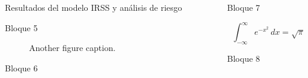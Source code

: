 \documentclass[final]{beamer}
\newlength{\sepwidth}
\newlength{\colwidth}
\newcommand{\separatorcolumn}{\begin{column}{\sepwidth}\end{column}}
\begin{document}
\begin{frame}[t]
\begin{columns}[t]
\begin{column}{\colwidth}
\begin{block}{Resultados del modelo IRSS y análisis de riesgo}
  \end{block}
  \begin{block}{Bloque 5}

    \begin{figure}
      \centering
      \caption{Another figure caption.}
    \end{figure}

  \end{block}
  \begin{block}{Bloque 6}



  \end{block}

\end{column}

\separatorcolumn

\begin{column}{\colwidth}
  \begin{exampleblock}{Bloque 7}

    $$
    \int_{-\infty}^{\infty} e^{-x^2}\,dx = \sqrt{\pi}
    $$


  \end{exampleblock}
  \begin{block}{Bloque 8}



\end{block}
\end{column}
\end{columns}
\end{frame}
\end{document}
